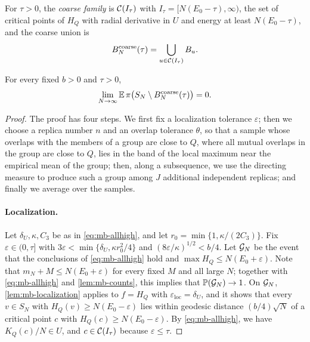 For $\tau>0$, the \emph{coarse family} is $\mathcal C(I_\tau)$ with $I_\tau=[N(E_0-\tau),\infty)$, the set of critical points of $H_Q$ with radial derivative in $U$ and energy at least $N(E_0-\tau)$, and the coarse union is
\[
B^{\mathrm{coarse}}_N(\tau)=\bigcup_{u\in\mathcal C(I_\tau)}B_u .
\]

\begin{proposition}\label{prop:mb-coarse}
For every fixed $b>0$ and $\tau>0$,
\begin{equation}\label{eq:mb-coarse}
\lim_{N\to\infty}\mathbb E\,\pi\bigl(S_N\setminus B^{\mathrm{coarse}}_N(\tau)\bigr)=0 .
\end{equation}
\end{proposition}

\begin{proof}
The proof has four steps. We first fix a localization tolerance $\varepsilon$; then we choose a replica number $n$ and an overlap tolerance $\theta$, so that a sample whose overlaps with the members of a group are close to $Q$, where all mutual overlaps in the group are close to $Q$, lies in the band of the local maximum near the empirical mean of the group; then, along a subsequence, we use the directing measure to produce such a group among $J$ additional independent replicas; and finally we average over the samples.

\paragraph{Localization.}
Let $\delta_U,\kappa,C_3$ be as in \eqref{eq:mb-allhigh}, and let $r_0=\min\{1,\kappa/(2C_3)\}$. Fix $\varepsilon\in(0,\tau]$ with $3\varepsilon<\min\{\delta_U,\kappa r_0^2/4\}$ and $(8\varepsilon/\kappa)^{1/2}<b/4$. Let $\mathcal G_N$ be the event that the conclusions of \eqref{eq:mb-allhigh} hold and $\max H_Q\le N(E_0+\varepsilon)$. Note that $m_N+M\le N(E_0+\varepsilon)$ for every fixed $M$ and all large $N$; together with \eqref{eq:mb-allhigh} and \cref{lem:mb-counts}, this implies that $\mathbb P(\mathcal G_N)\to1$. On $\mathcal G_N$, \cref{lem:mb-localization} applies to $f=H_Q$ with $\varepsilon_{\mathrm{loc}}=\delta_U$, and it shows that every $v\in S_N$ with $H_Q(v)\ge N(E_0-\varepsilon)$ lies within geodesic distance $(b/4)\sqrt N$ of a critical point $c$ with $H_Q(c)\ge N(E_0-\varepsilon)$. By \eqref{eq:mb-allhigh}, we have $K_Q(c)/N\in U$, and $c\in\mathcal C(I_\tau)$ because $\varepsilon\le\tau$.


\end{proof}
